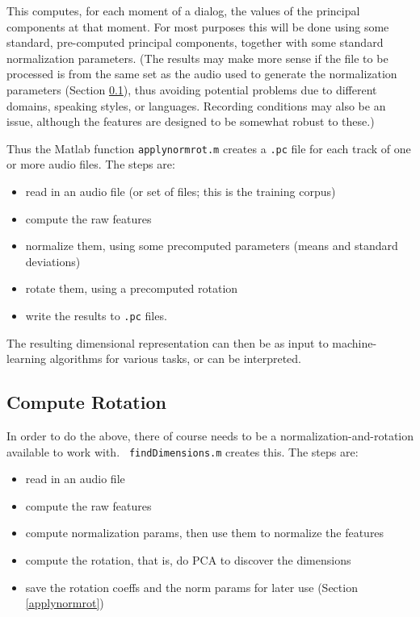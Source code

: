\documentclass[11pt]{article}
\begin{document}
This computes, for each moment of a dialog, the values of the
principal components at that moment.  For most purposes this will be
done using some standard, pre-computed principal components, together
with some standard normalization parameters.  (The results may make
more sense if the file to be processed is from the same set as the
audio used to generate the normalization parameters (Section
\ref{computerotation}), thus avoiding potential problems due to
different domains, speaking styles, or languages.  Recording
conditions may also be an issue, although the features are designed to
be somewhat robust to these.)

Thus the Matlab function {\tt applynormrot.m} creates a {\tt .pc} file
for each track of one or more audio files.  The steps are:
\begin{itemize}   \setlength{\itemsep}{0pt}\setlength{\parskip}{0pt}
\item read in an audio file (or set of files; this is the training corpus)
\item compute the raw  features
\item normalize them, using some precomputed parameters (means and
  standard deviations)
\item  rotate them, using a precomputed rotation
\item  write the results to {\tt .pc} files.
\end{itemize}

The resulting dimensional representation can then be as input to
machine-learning algorithms for various tasks, or can be interpreted.


\subsection{Compute Rotation} \label{computerotation}

In order to do the above, there of course needs to be a
normalization-and-rotation available to work with.  {\tt
  findDimensions.m} creates this.  The steps are:
\begin{itemize}   \setlength{\itemsep}{0pt}\setlength{\parskip}{0pt}
\item read in an audio file 
\item compute the raw  features
\item compute normalization params, then use them to normalize the features
\item compute the rotation, that is, do PCA to discover the dimensions
\item save the rotation coeffs and the norm params for later use (Section \ref{applynormrot})
\end{itemize}
\end{document}
